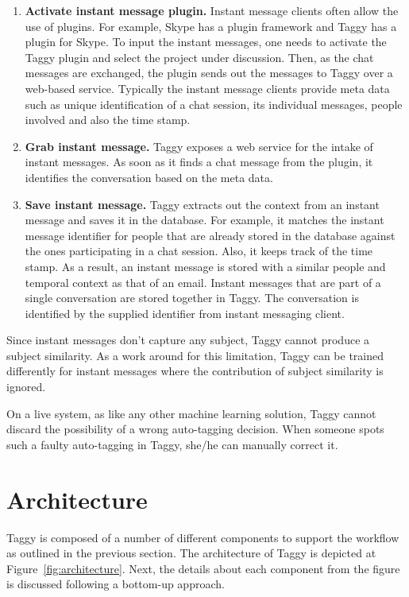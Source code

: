 \begin{enumerate}
	\item \textbf{Activate instant message plugin.} Instant message clients often allow the use of plugins. For example, Skype \cite{skype} has a plugin framework and Taggy has a plugin for Skype. To input the instant messages, one needs to activate the Taggy plugin and select the project under discussion. Then, as the chat messages are exchanged, the plugin sends out the messages to Taggy over a web-based service. Typically the instant message clients provide meta data such as unique identification of a chat session, its individual messages, people involved and also the time stamp.

	\item \textbf{Grab instant message.} Taggy exposes a web service for the intake of instant messages. As soon as it finds a chat message from the plugin, it identifies the conversation based on the meta data.
	
	\item \textbf{Save instant message.} Taggy extracts out the context from an instant message and saves it in the database. For example, it matches the instant message identifier for people that are already stored in the database against the ones participating in a chat session. Also, it keeps track of the time stamp. As a result, an instant message is stored with a similar people and temporal context as that of an email. Instant messages that are part of a single conversation are stored together in Taggy. The conversation is identified by the supplied identifier from instant messaging client.
\end{enumerate}

Since instant messages don't capture any subject, Taggy cannot produce a subject similarity. As a work around for this limitation, Taggy can be trained differently for instant messages where the contribution of subject similarity is ignored.

On a live system, as like any other machine learning solution, Taggy cannot discard the possibility of a wrong auto-tagging decision. When someone spots such a faulty auto-tagging in Taggy, she/he can manually correct it.

\section{Architecture}
Taggy is composed of a number of different components to support the workflow as outlined in the previous section. The architecture of Taggy is depicted at Figure~\ref{fig:architecture}. Next, the details about each component from the figure is discussed following a bottom-up approach.

